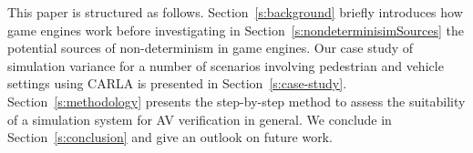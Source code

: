 \documentclass[letterpaper, 10 pt, journal, twoside]{IEEEtran}
\begin{document}
This paper is structured as follows.
%
Section~\ref{s:background} briefly introduces how game engines work before investigating in Section~\ref{s:nondeterminisimSources} the potential sources of non-determinism in game engines.
%
Our case study of simulation variance for a number of scenarios involving pedestrian and vehicle settings using CARLA is presented in Section~\ref{s:case-study}.
%
Section~\ref{s:methodology} presents the step-by-step method to assess the suitability of a simulation system for AV verification in general. 
%
We conclude in Section~\ref{s:conclusion} and give an outlook on future work.







\end{document}
